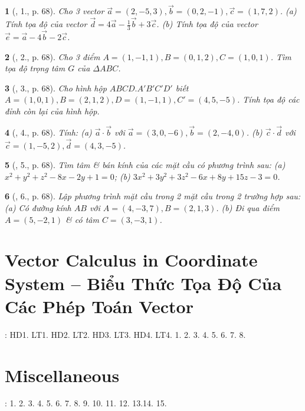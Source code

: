 \documentclass{article}
\newtheorem{baitoan}{}
\begin{document}
\begin{baitoan}[\cite{SGK_Toan_12_hinh_hoc_co_ban}, 1., p. 68]
	Cho 3 vector $\vec{a} = (2,-5,3),\vec{b} = (0,2,-1),\vec{c} = (1,7,2)$. (a) Tính tọa độ của vector $\vec{d} = 4\vec{a} - \frac{1}{3}\vec{b} + 3\vec{c}$. (b) Tính tọa độ của vector $\vec{e} = \vec{a} - 4\vec{b} - 2\vec{c}$.
\end{baitoan}

\begin{baitoan}[\cite{SGK_Toan_12_hinh_hoc_co_ban}, 2., p. 68]
	Cho 3 điểm $A = (1,-1,1),B = (0,1,2),C = (1,0,1)$. Tìm tọa độ trọng tâm $G$ của $\Delta ABC$.
\end{baitoan}

\begin{baitoan}[\cite{SGK_Toan_12_hinh_hoc_co_ban}, 3., p. 68]
	Cho hình hộp $ABCD.A'B'C'D'$ biết $A = (1,0,1),B = (2,1,2),D = (1,-1,1),C' = (4,5,-5)$. Tính tọa độ các đỉnh còn lại của hình hộp.
\end{baitoan}

\begin{baitoan}[\cite{SGK_Toan_12_hinh_hoc_co_ban}, 4., p. 68]
	Tính: (a) $\vec{a}\cdot\vec{b}$ với $\vec{a} = (3,0,-6),\vec{b} = (2,-4,0)$. (b) $\vec{c}\cdot\vec{d}$ với $\vec{c} = (1,-5,2),\vec{d} = (4,3,-5)$.
\end{baitoan}

\begin{baitoan}[\cite{SGK_Toan_12_hinh_hoc_co_ban}, 5., p. 68]
	Tìm tâm \& bán kính của các mặt cầu có phương trình sau: (a) $x^2 + y^2 + z^2 - 8x - 2y + 1 = 0$; (b) $3x^2 + 3y^2 + 3z^2 - 6x + 8y + 15z - 3 = 0$.
\end{baitoan}

\begin{baitoan}[\cite{SGK_Toan_12_hinh_hoc_co_ban}, 6., p. 68]
	Lập phương trình mặt cầu trong 2 mặt cầu trong 2 trường hợp sau: (a) Có đường kính $AB$ với $A = (4,-3,7),B = (2,1,3)$. (b) Đi qua điểm $A = (5,-2,1)$ \& có tâm $C = (3,-3,1)$.
\end{baitoan}


\section{Vector Calculus in Coordinate System -- Biểu Thức Tọa Độ Của Các Phép Toán Vector}
\cite[Chap. II, \S3, pp. 74--81]{SGK_Toan_12_Canh_Dieu_tap_1}: HD1. LT1. HD2. LT2. HD3. LT3. HD4. LT4. 1. 2. 3. 4. 5. 6. 7. 8.


\section{Miscellaneous}
\cite[BTCCII, pp. 82--83]{SGK_Toan_12_Canh_Dieu_tap_1}: 1. 2. 3. 4. 5. 6. 7. 8. 9. 10. 11. 12. 13.14. 15.


\printbibliography[heading=bibintoc]
	
\end{document}
